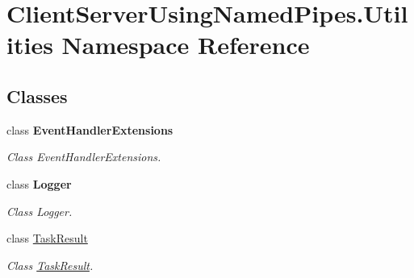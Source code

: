 \hypertarget{namespace_client_server_using_named_pipes_1_1_utilities}{}\section{Client\+Server\+Using\+Named\+Pipes.\+Utilities Namespace Reference}
\label{namespace_client_server_using_named_pipes_1_1_utilities}
\subsection*{Classes}
\begin{DoxyCompactItemize}
\item 
class {\bfseries Event\+Handler\+Extensions}
\begin{DoxyCompactList}\small\item\em Class Event\+Handler\+Extensions. \end{DoxyCompactList}\item 
class {\bfseries Logger}
\begin{DoxyCompactList}\small\item\em Class Logger. \end{DoxyCompactList}\item 
class \hyperlink{class_client_server_using_named_pipes_1_1_utilities_1_1_task_result}{Task\+Result}
\begin{DoxyCompactList}\small\item\em Class \hyperlink{class_client_server_using_named_pipes_1_1_utilities_1_1_task_result}{Task\+Result}. \end{DoxyCompactList}\end{DoxyCompactItemize}
